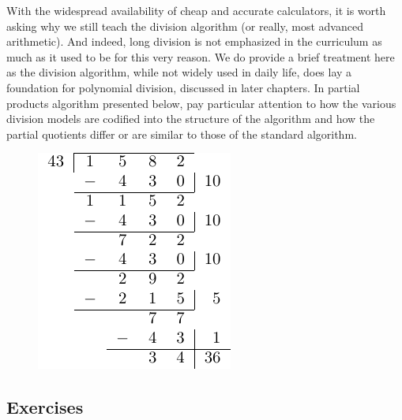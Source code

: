 \documentclass[
]{book}
\theoremstyle{definition}
\theoremstyle{definition}
\theoremstyle{definition}
\theoremstyle{definition}
\theoremstyle{remark}
\begin{document}
With the widespread availability of cheap and accurate calculators, it is worth asking why we still teach the division algorithm (or really, most advanced arithmetic). And indeed, long division is not emphasized in the curriculum as much as it used to be for this very reason. We do provide a brief treatment here as the division algorithm, while not widely used in daily life, does lay a foundation for polynomial division, discussed in later chapters. In partial products algorithm presented below, pay particular attention to how the various division models are codified into the structure of the algorithm and how the partial quotients differ or are similar to those of the standard algorithm.

\begin{figure}

{\centering \includegraphics[width=0.6\linewidth]{tikz/division-algorithm-standard} 

}

\end{figure}

\hypertarget{exercises-11}{%
\subsection{Exercises}\label{exercises-11}}
\end{document}
